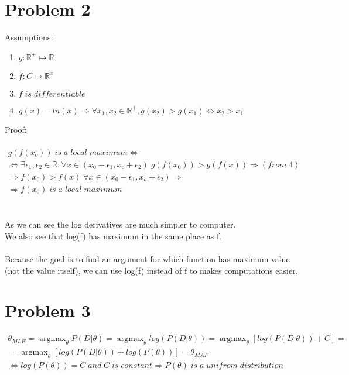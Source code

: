 \documentclass{article}
\DeclareMathOperator*{\argmax}{argmax}
\begin{document}
\section{Problem 2}
Assumptions:
\begin{enumerate}
\item    $ g: \mathbb{R}^+ \mapsto \mathbb{R} $
\item    $ f: C \mapsto \mathbb{R}^x $
\item    $ f \; is \;  differentiable $
\item    $ g(x) = ln(x) \Rightarrow  \forall  x_1,x_2 \in \mathbb{R}^+, g(x_2) > g(x_1) \Leftrightarrow x_2 > x_1$   
\end{enumerate}
Proof:
\\\\
\begin{multline}
g(f(x_o)) \; is \; a \; local \; maximum \Leftrightarrow \\ 
\Leftrightarrow  \exists \epsilon_1, \epsilon_2 \in \mathbb{R} : \forall x \in (x_0 - \epsilon_1, x_o + \epsilon_2 ) \; g(f(x_0)) > g(f(x)) \Rightarrow (from \; 4) \\ 
\Rightarrow f(x_0) > f(x)  \; \forall x \in (x_0 - \epsilon_1, x_o + \epsilon_2) \Rightarrow \\ 
\Rightarrow f(x_0) \; is \; a\; local \; maximum 
\end{multline} 
\\\\
As we can see the log derivatives are much simpler to computer.\\
We also see that log(f) has maximum in the same place as f.
\\\\
Because the goal is to find an argument for which function has maximum value (not the value itself),
we can use log(f) instead of f to makes computations easier.

\section{Problem 3}

\begin{multline}
\theta_{MLE} = \argmax_\theta P(D|\theta) = \argmax_\theta log(P(D|\theta)) = 
\argmax_\theta [log(P(D|\theta)) + C] = \\ = \argmax_\theta [log(P(D|\theta)) + log(P(\theta))] = \theta_{MAP} \\
\Leftrightarrow
log(P(\theta)) = C \; and \; C \; is \; constant \Rightarrow P(\theta) \; is \; a \; unifrom \; distribution
\end{multline}
\end{document}
